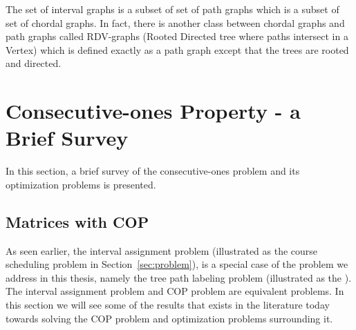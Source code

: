 The set of interval graphs is a subset of set of path graphs which is
a subset of set of chordal graphs. In fact, there is another class
between chordal graphs and path graphs called RDV-graphs (Rooted
Directed tree where paths intersect in a Vertex)  \cite{mw86} which is
defined exactly as a path graph except that the trees are rooted and
directed. 

\section[Brief Survey]{Consecutive-ones Property - a Brief Survey}
\label{sec:background}

In this section, a brief survey of the consecutive-ones problem and
its optimization problems is presented.


\subsection{Matrices with COP}
\label{sec:copmatrices}
As seen earlier, the interval assignment problem (illustrated as the
course scheduling problem in Section~\ref{sec:problem}), is a special
case of the problem we address in this thesis, namely the tree path
labeling problem (illustrated as the \illustrationproblem). The
interval assignment problem and COP problem are equivalent
problems. In this section we will see some of the results that exists
in the literature today towards solving the COP problem and
optimization problems surrounding it.


